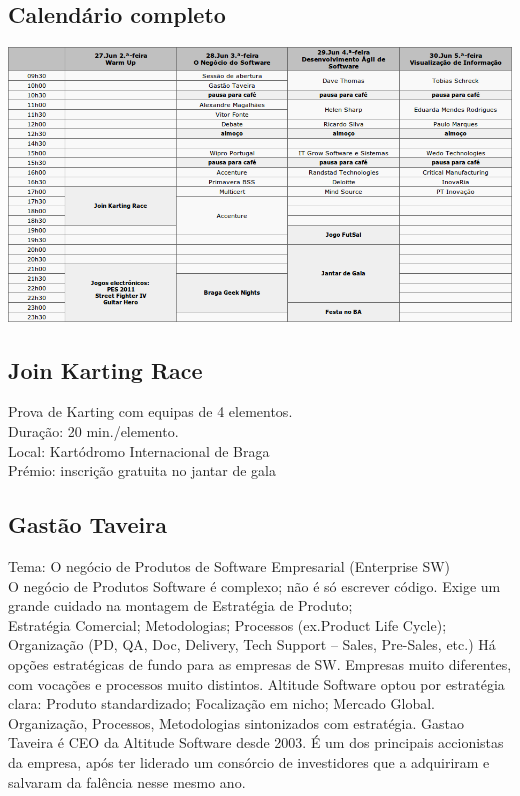 
\subsection{Calendário completo}
\includegraphics[width=\textwidth]{material/tabela_plano.png}

\subsection{Join Karting Race}
Prova de Karting com equipas de 4 elementos.\\
Duração: 20 min./elemento.\\
Local: Kartódromo Internacional de Braga\\
Prémio: inscrição gratuita no jantar de gala\\

\subsection{Gastão Taveira}
Tema: O negócio de Produtos de Software Empresarial (Enterprise SW)\\

O negócio de Produtos Software é complexo; não é só escrever 
código. Exige um grande cuidado na montagem de Estratégia de Produto; 
\\
Estratégia  Comercial; Metodologias; Processos (ex.Product Life 
Cycle); Organização (PD,  QA, Doc, Delivery, Tech Support – Sales, 
Pre-Sales, etc.) Há opções estratégicas de fundo para as empresas de SW. Empresas muito  diferentes, com vocações e processos muito distintos. Altitude Software optou por estratégia clara: Produto standardizado; Focalização em nicho; Mercado Global. Organização, Processos, Metodologias sintonizados com estratégia. Gastao Taveira é CEO da Altitude Software desde 2003. É um dos principais accionistas da empresa, após ter liderado um consórcio de investidores que a adquiriram e salvaram da falência nesse mesmo ano.\\

